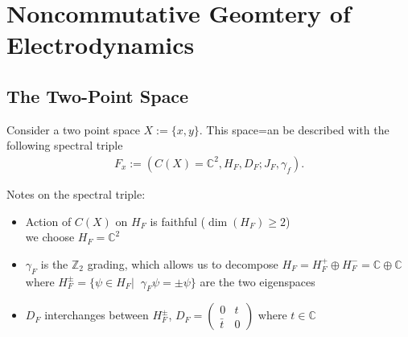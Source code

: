 \documentclass[a4paper]{article}
\theoremstyle{definition}
\theoremstyle{definition}
\theoremstyle{definition}
\theoremstyle{theorem}
\theoremstyle{theorem}
\theoremstyle{theorem}
\begin{document}
    \section{Noncommutative Geomtery of Electrodynamics}
    \subsection{The Two-Point Space}
    Consider a two point space $X := \{x, y\}$. This space=an be described
    with
    the following spectral triple
    \begin{align}
        F_x := (C(X) = \mathbb{C}^2, H_F, D_F; J_F, \gamma _f).
    \end{align}

    Notes on the spectral triple:
    \begin{itemize}
        \item Action of $C(X)$ on $H_F$ is faithful ($\dim (H_F) \geq 2$)\\
            we choose $H_F = \mathbb{C}^2$
        \item $\gamma_F$ is the $\mathbb{Z}_2$ grading, which allows us to
            decompose $H_F = H_F^+ \oplus H_F^- = \mathbb{C} \oplus \mathbb{C}$\\
            where $H_F^{\pm} = \{ \psi \in H_F |\;\; \gamma _F \psi = \pm \psi\}$
            are the two eigenspaces
        \item $D_F$ interchanges between $H_F^\pm$, $D_F =
            \begin{pmatrix}0 & t \\ \bar{t} & 0\end{pmatrix}$ where $t \in
                \mathbb{C}$
    \end{itemize}
\end{document}
